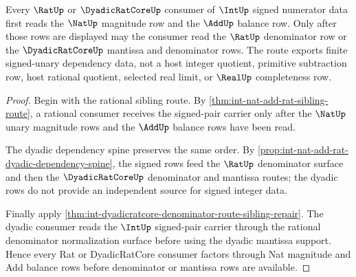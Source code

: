 \begin{theorem}
\label{thm:int-nat-add-dyadic-sibling-exhaustion}
Every $\RatUp$ or $\DyadicRatCoreUp$ consumer of $\IntUp$ signed numerator data first reads the $\NatUp$ magnitude row and the $\AddUp$ balance row. Only after those rows are displayed may the consumer read the $\RatUp$ denominator row or the $\DyadicRatCoreUp$ mantissa and denominator rows. The route exports finite signed-unary dependency data, not a host integer quotient, primitive subtraction row, host rational quotient, selected real limit, or $\RealUp$ completeness row.
\end{theorem}
\begin{proof}
Begin with the rational sibling route. By \autoref{thm:int-nat-add-rat-sibling-route}, a rational consumer receives the signed-pair carrier only after the $\NatUp$ unary magnitude rows and the $\AddUp$ balance rows have been read.

The dyadic dependency spine preserves the same order. By \autoref{prop:int-nat-add-rat-dyadic-dependency-spine}, the signed rows feed the $\RatUp$ denominator surface and then the $\DyadicRatCoreUp$ denominator and mantissa routes; the dyadic rows do not provide an independent source for signed integer data.

Finally apply \autoref{thm:int-dyadicratcore-denominator-route-sibling-repair}. The dyadic consumer reads the $\IntUp$ signed-pair carrier through the rational denominator normalization surface before using the dyadic mantissa support. Hence every Rat or DyadicRatCore consumer factors through Nat magnitude and Add balance rows before denominator or mantissa rows are available.
\end{proof}
